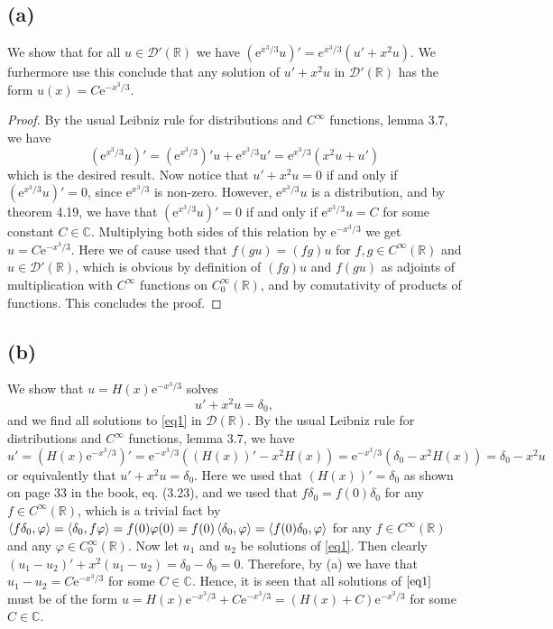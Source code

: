 \documentclass[a4paper,11pt]{article}
\newcommand{\euler}[1]{\text{e}^{#1}}
\newcommand{\R}{\mathbb{R}}
\newcommand{\C}{\mathbb{C}}
\numberwithin{equation}{section}
\begin{document}
\subsection*{(a)}
We show that for all $ u\in\mathcal{D}'(\R) $ we have $ (\euler{x^3/3}u)'=e^{x^3/3}(u'+x^2u) $. We furhermore use this conclude that any solution of $ u'+x^2u $ in $ \mathcal{D}'(\R) $ has the form $ u(x)=C\euler{-x^3/3} $.
\begin{proof}
	By the usual Leibniz rule for distributions and $ C^\infty $ functions, lemma 3.7, we have \begin{equation}
	(\euler{x^3/3}u)'=(\euler{x^3/3})'u+\euler{x^3/3}u'=\euler{x^3/3}(x^2 u+u')
	\end{equation}
	which is the desired result. Now notice that $ u'+x^2u=0 $ if and only if $ (\euler{x^3/3}u)'=0 $, since $ \euler{x^3/3} $ is non-zero. However, $ \euler{x^3/3}u $ is a distribution, and by theorem 4.19, we have that $ (\euler{x^3/3}u )'=0 $ if and only if $ \euler{x^3/3}u =C $ for some constant $ C\in\C $. Multiplying both sides of this relation by $ \euler{-x^3/3} $ we get $ u=C\euler{-x^3/3} $. Here we of cause used that $ f(gu)=(fg)u $ for $ f,g\in C^\infty(\R) $ and $ u\in\mathcal{D}'(\R) $, which is obvious by definition of $ (fg)u $ and $ f(gu) $ as adjoints of multiplication with $ C^\infty $ functions on $ C^\infty_0(\R) $, and by comutativity of products of functions. This concludes the proof.
\end{proof}
\subsection*{(b)}
We show that $ u=H(x)\euler{-x^3/3} $ solves \begin{equation} \label{eq1}
u'+x^2u=\delta_0,
\end{equation}
and we find all solutions to \eqref{eq1} in $ \mathcal{D}(\R) $.
By the usual Leibniz rule for distributions and $ C^\infty $ functions, lemma 3.7, we have \begin{equation}
u'=(H(x)\euler{-x^3/3})'=\euler{-x^3/3}((H(x))'-x^2 H(x))=\euler{-x^3/3}(\delta_0-x^2H(x))=\delta_0-x^2 u
\end{equation}
or equivalently that $ u'+x^2u=\delta_0 $. Here we used that $ (H(x))'=\delta_0 $ as shown on page 33 in the book, eq. (3.23), and we used that $ f\delta_0=f(0)\delta_0 $ for any $ f\in C^{\infty}(\R) $, which is a trivial fact by $ \braket{f\delta_0,\varphi}=\braket{\delta_0,f\varphi}=f(0)\varphi(0)=f(0)\braket{\delta_0,\varphi}=\braket{f(0)\delta_0,\varphi} $ for any $ f\in C^\infty(\R) $ and any $ \varphi\in C^{\infty}_0(\R) $.
Now let $ u_1 $ and $ u_2 $ be solutions of \eqref{eq1}. Then clearly $ (u_1-u_2)'+x^2(u_1-u_2)=\delta_0-\delta_0=0 $. Therefore, by (a) we have that $ u_1-u_2=C\euler{-x^3/3} $ for some $ C\in \C $. Hence, it is seen that all solutions of $ \eqref{eq1} $ must be of the form $ u=H(x)\euler{-x^3/3}+C\euler{-x^3/3}=(H(x)+C)\euler{-x^3/3} $ for some $ C\in \C $.
\end{document}
